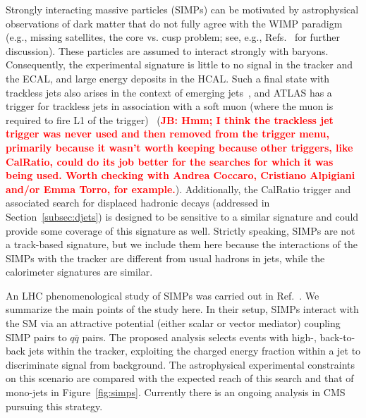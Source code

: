 {Strongly interacting massive particles (SIMPs) can be motivated by astrophysical observations of dark matter that do not fully agree with the WIMP paradigm (e.g., missing satellites, the core vs. cusp problem; see, e.g., Refs.~\cite{2010arXiv1009.4505B,2011MNRAS.415L..40B,Weinberg:2013aya,1742-6596-437-1-012001} for further discussion). These particles are assumed to interact strongly with baryons. Consequently, the experimental signature is little to no signal in the tracker and the ECAL, and large energy deposits in the HCAL. Such a final state with trackless jets also arises in the context of emerging jets~\cite{Schwaller:2015gea}, and ATLAS has a trigger for trackless jets in association with a soft muon (where the muon is required to fire L1 of the trigger)~\cite{ATLASLLPTriggers} ({\bf \textcolor{red}{JB: Hmm; I think the trackless jet trigger was never used and then removed from the trigger menu, primarily because it wasn't worth keeping because other triggers, like CalRatio, could do its job better for the searches for which it was being used.  Worth checking with Andrea Coccaro, Cristiano Alpigiani and/or Emma Torro, for example.}}). Additionally, the CalRatio trigger and associated search for displaced hadronic decays (addressed in Section~\ref{subsec:djets}) is designed to be sensitive to a similar signature and could provide some coverage of this signature as well. Strictly speaking, SIMPs are not a track-based signature, but we include them here because the interactions of the SIMPs with the tracker are different from usual hadrons in jets, while the calorimeter signatures are similar.

An LHC phenomenological study of SIMPs was carried out in Ref.~\cite{Daci:2015hca}. We summarize the main points of the study here. In their setup, SIMPs interact with the SM via an attractive potential (either scalar or vector mediator) coupling SIMP pairs to $q\bar{q}$ pairs. The proposed analysis selects events with high-\pT, back-to-back jets within the tracker, exploiting the charged energy fraction within a jet to discriminate signal from background. The astrophysical experimental constraints on this scenario are compared with the expected reach of this search and that of mono-jets in Figure~\ref{fig:simps}. Currently there is an ongoing analysis in CMS pursuing this strategy.

}
